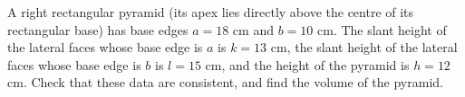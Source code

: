 A right rectangular pyramid (its apex lies directly above the centre of its rectangular base) has base edges $a=18$ cm and $b=10$ cm. The slant height of the lateral faces whose base edge is $a$ is $k=13$ cm, the slant height of the lateral faces whose base edge is $b$ is $l=15$ cm, and the height of the pyramid is $h=12$ cm. Check that these data are consistent, and find the volume of the pyramid.
